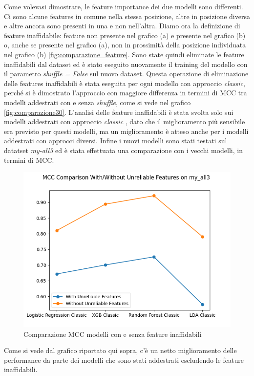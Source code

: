 Come volevasi dimostrare, le feature importance dei due modelli sono differenti. Ci sono alcune features in comune nella stessa posizione, altre in posizione diversa e altre ancora sono presenti in una e non nell'altra. Diamo ora la definizione di feature inaffidabile: feature non presente nel grafico (a) e presente nel grafico (b) o, anche se presente nel grafico (a), non in prossimit\`a della posizione individuata nel grafico (b)  \ref{fig:comparazione_feature}. Sono state quindi eliminate le feature inaffidabili dal dataset ed \`e stato eseguito nuovamente il training del modello con il parametro \textit{shuffle = False} sul nuovo dataset.
Questa operazione di eliminazione delle features inaffidabili \`e stata eseguita per ogni modello con approccio \textit{classic}, perch\'e si \`e dimostrato l'approccio con maggiore differenza in termini di MCC tra modelli addestrati con e senza \textit{shuffle}, come si vede nel grafico \ref{fig:comparazione30}. L'analisi delle feature inaffidabili \`e stata svolta solo sui modelli addestrati con approccio \textit{classic} , dato che il miglioramento pi\`u sensibile era previsto per questi modelli, ma un miglioramento \`e atteso anche per i modelli addestrati con approcci diversi. Infine i nuovi modelli sono stati testati sul datatset \textit{my-all3} ed \`e stata effettuata una comparazione con i vecchi modelli, in termini di MCC.

\begin{figure}[H]
    \centering
    \includegraphics[width=0.78\linewidth]{MCC_Comparison_With_Without_Unreliable_Features_All3.png}
    \caption{Comparazione MCC modelli con e senza feature inaffidabili}
    \label{fig:enter-label}
\end{figure}

\vspace{0.5 cm}

Come si vede dal grafico riportato qui sopra, c'\`e un netto miglioramento delle performance da parte dei modelli che sono stati addestrati escludendo le feature inaffidabili.


 \vspace{-0.5cm}
 \vspace{-0.3cm}
